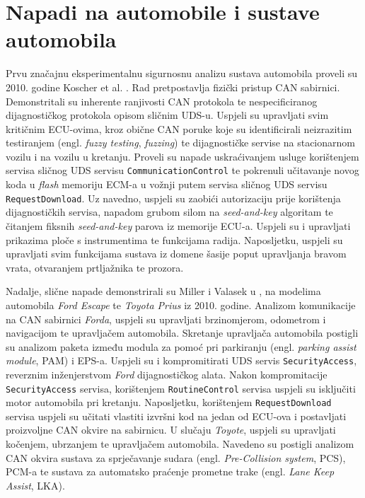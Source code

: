 \documentclass[times, utf8, diplomski, numeric]{fer}
\begin{document}
\section{Napadi na automobile i sustave automobila}
Prvu značajnu eksperimentalnu sigurnosnu analizu sustava automobila proveli su 2010. godine Koscher et al. \cite{koscher2010}. Rad pretpostavlja fizički pristup CAN sabirnici. Demonstritali su inherente ranjivosti CAN protokola te nespecificiranog dijagnostičkog protokola opisom sličnim UDS-u. Uspjeli su upravljati svim kritičnim ECU-ovima, kroz obične CAN poruke koje su identificirali neizrazitim testiranjem (engl. \textit{fuzzy testing}, \textit{fuzzing}) te dijagnostičke servise na stacionarnom vozilu i na vozilu u kretanju. Proveli su napade uskraćivanjem usluge korištenjem servisa sličnog UDS servisu \texttt{CommunicationControl} te pokrenuli učitavanje novog koda u \textit{flash} memoriju ECM-a u vožnji putem servisa sličnog UDS servisu \texttt{RequestDownload}. Uz navedno, uspjeli su zaobići autorizaciju prije korištenja dijagnostičkih servisa, napadom grubom silom na \textit{seed-and-key} algoritam te čitanjem fiksnih \textit{seed-and-key} parova iz memorije ECU-a. Uspjeli su i upravljati prikazima ploče s instrumentima te funkcijama radija. Naposljetku, uspjeli su upravljati svim funkcijama sustava iz domene šasije poput upravljanja bravom vrata, otvaranjem prtljažnika te prozora.

Nadalje, slične napade demonstrirali su Miller i Valasek u \cite{miller2013adventures}, na modelima automobila \textit{Ford Escape} te \textit{Toyota Prius} iz 2010. godine. Analizom komunikacije na CAN sabirnici \textit{Forda}, uspjeli su upravljati brzinomjerom, odometrom i navigacijom te upravljačem automobila. Skretanje upravljača automobila postigli su analizom paketa između modula za pomoć pri parkiranju (engl. \textit{parking assist module}, PAM) i EPS-a. Uspjeli su i kompromitirati UDS servis \texttt{SecurityAccess}, reverznim inženjerstvom \textit{Ford} dijagnostičkog alata. Nakon kompromitacije \texttt{SecurityAccess} servisa, korištenjem \texttt{RoutineControl} servisa uspjeli su isključiti motor automobila pri kretanju. Naposljetku, korištenjem \texttt{RequestDownload} servisa uspjeli su učitati vlastiti izvršni kod na jedan od ECU-ova i postavljati proizvoljne CAN okvire na sabirnicu. U slučaju \textit{Toyote}, uspjeli su upravljati kočenjem, ubrzanjem te upravljačem automobila. Navedeno su postigli analizom CAN okvira sustava za sprječavanje sudara (engl. \textit{Pre-Collision system}, PCS), PCM-a te sustava za automatsko praćenje prometne trake (engl. \textit{Lane Keep Assist}, LKA).
\end{document}

